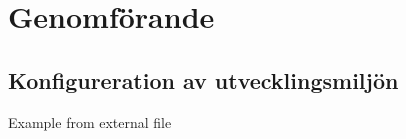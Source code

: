 %


\section{Genomförande}


\subsection{Konfigureration av utvecklingsmiljön}
% 
%   
%







\caption{Example from external file}
\label{listing:inlupp}
